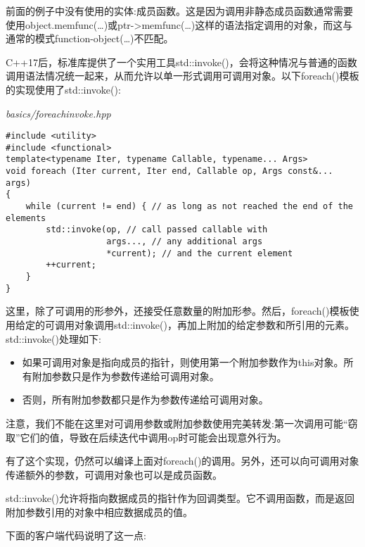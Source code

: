 
前面的例子中没有使用的实体:成员函数。这是因为调用非静态成员函数通常需要使用object.memfunc(…)或ptr->memfunc(…)这样的语法指定调用的对象，而这与通常的模式function-object(…)不匹配。

C++17后，标准库提供了一个实用工具std::invoke()，会将这种情况与普通的函数调用语法情况统一起来，从而允许以单一形式调用可调用对象。以下foreach()模板的实现使用了std::invoke():

\noindent
\textit{basics/foreachinvoke.hpp}
\begin{lstlisting}[style=styleCXX]
#include <utility>
#include <functional>
template<typename Iter, typename Callable, typename... Args>
void foreach (Iter current, Iter end, Callable op, Args const&... args)
{
	while (current != end) { // as long as not reached the end of the elements
		std::invoke(op, // call passed callable with
					args..., // any additional args
					*current); // and the current element
		++current;
	}
}
\end{lstlisting}

这里，除了可调用的形参外，还接受任意数量的附加形参。然后，foreach()模板使用给定的可调用对象调用std::invoke()，再加上附加的给定参数和所引用的元素。std::invoke()处理如下:

\begin{itemize}
\item 
如果可调用对象是指向成员的指针，则使用第一个附加参数作为this对象。所有附加参数只是作为参数传递给可调用对象。

\item 
否则，所有附加参数都只是作为参数传递给可调用对象。
\end{itemize}

注意，我们不能在这里对可调用参数或附加参数使用完美转发:第一次调用可能“窃取”它们的值，导致在后续迭代中调用op时可能会出现意外行为。

有了这个实现，仍然可以编译上面对foreach()的调用。另外，还可以向可调用对象传递额外的参数，可调用对象也可以是成员函数。

\begin{tcolorbox}[colback=webgreen!5!white,colframe=webgreen!75!black]
\hspace*{0.75cm}std::invoke()允许将指向数据成员的指针作为回调类型。它不调用函数，而是返回附加参数引用的对象中相应数据成员的值。
\end{tcolorbox}

下面的客户端代码说明了这一点:

